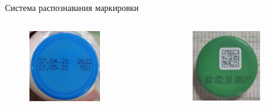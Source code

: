 \documentclass[10pt]{beamer}
\begin{document}
\begin{frame}{Система распознавания маркировки}
            \begin{columns}
                \begin{column}{0.4\textwidth}
                    \begin{figure}[H]
                        \centering
                        \includegraphics[width=0.7\textwidth]{pic4-1.jpg}
                    \end{figure}
                \end{column}
                \begin{column}{0.4\textwidth}
                    \begin{figure}[H]
                        \centering
                        \includegraphics[width=0.7\textwidth]{cap_new.jpg}
                    \end{figure}
                \end{column}
            \end{columns}
        \end{frame}
\end{document}
